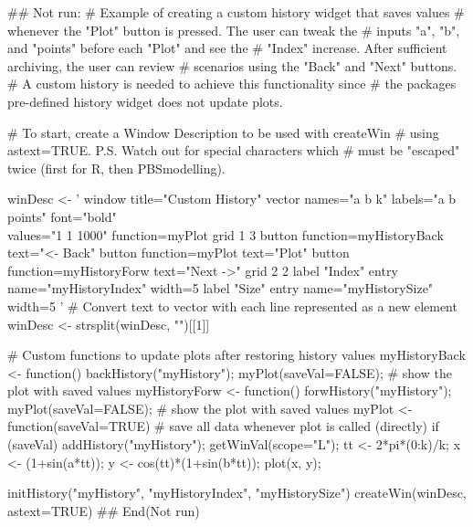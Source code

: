 \documentclass[letterpaper]{book}
\begin{document}
\begin{Examples}
\begin{ExampleCode}
## Not run: 
# Example of creating a custom history widget that saves values 
# whenever the "Plot" button is pressed. The user can tweak the 
# inputs "a", "b", and "points" before each "Plot" and see the 
# "Index" increase. After sufficient archiving, the user can review 
# scenarios using the "Back" and "Next" buttons. 
# A custom history is needed to achieve this functionality since 
# the packages pre-defined history widget does not update plots.

# To start, create a Window Description to be used with createWin 
# using astext=TRUE. P.S. Watch out for special characters which 
# must be "escaped" twice (first for R, then PBSmodelling).

winDesc <- '
        window title="Custom History"
        vector names="a b k" labels="a b points" font="bold" \\
        values="1 1 1000" function=myPlot
        grid 1 3
                button function=myHistoryBack text="<- Back"
                button function=myPlot text="Plot"
                button function=myHistoryForw text="Next ->"
        grid 2 2
                label "Index"
                entry name="myHistoryIndex" width=5
                label "Size"
                entry name="myHistorySize" width=5
'
# Convert text to vector with each line represented as a new element
winDesc <- strsplit(winDesc, "\n")[[1]]

# Custom functions to update plots after restoring history values
myHistoryBack <- function() {
        backHistory("myHistory");
        myPlot(saveVal=FALSE); # show the plot with saved values
}
myHistoryForw <- function() {
        forwHistory("myHistory");
        myPlot(saveVal=FALSE); # show the plot with saved values 
}
myPlot <- function(saveVal=TRUE) {
        # save all data whenever plot is called (directly)
        if (saveVal) addHistory("myHistory");
        getWinVal(scope="L");
        tt <- 2*pi*(0:k)/k;
        x <- (1+sin(a*tt));  y <- cos(tt)*(1+sin(b*tt));
        plot(x, y);
}

initHistory("myHistory", "myHistoryIndex", "myHistorySize")
createWin(winDesc, astext=TRUE)
## End(Not run)
\end{ExampleCode}
\end{Examples}
\end{document}
